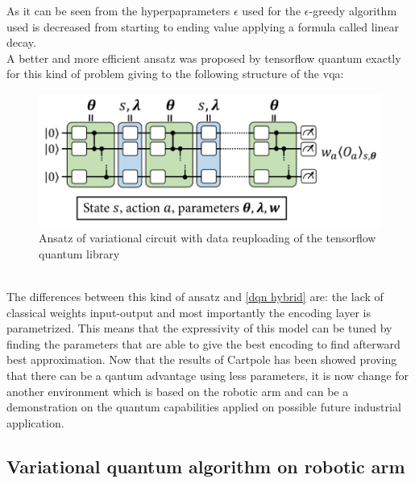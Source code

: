 As it can be seen from the hyperpaprameters $\epsilon$ used for the $\epsilon$-greedy algorithm used is decreased from starting to ending value applying a formula called linear decay.\\
A better and more efficient ansatz was proposed by tensorflow quantum exactly for this kind of problem giving to the following structure of the \acrlong{vqa}:
\begin{figure}[h]
	\centering
	\includegraphics[width=0.8\linewidth]{img/tfq}
	\caption{Ansatz of variational circuit with data reuploading of the tensorflow quantum library}
	\label{fig:tfq}
\end{figure}\\
The differences between this kind of ansatz and \ref{dqn hybrid} are: the lack of classical weights input-output and most importantly the encoding layer is parametrized. This means that the expressivity of this model can be tuned by finding the parameters that are able to give the best encoding to find afterward best approximation.
Now that the results of Cartpole has been showed proving that there can be a qantum advantage using less parameters, it is now change for another environment which is based on the robotic arm and can be a demonstration on the quantum capabilities applied on possible future industrial application.
\subsection{Variational quantum algorithm on robotic arm}
